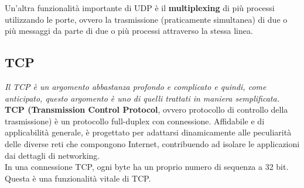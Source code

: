         Un’altra funzionalità importante di UDP è il \textbf{multiplexing} di più processi utilizzando le porte,
        ovvero la trasmissione (praticamente simultanea) di due o più messaggi da parte di due o più
        processi attraverso la stessa linea.
        
        \subsection{TCP}
        \textit{Il TCP è un argomento abbastanza profondo e complicato e quindi, come anticipato, questo
        argomento è uno di quelli trattati in maniera semplificata.}\\

        \textbf{TCP (Transmission Control Protocol}, ovvero protocollo di controllo della trasmissione) è un
        protocollo full-duplex con connessione. Affidabile e di applicabilità generale, è progettato per
        adattarsi dinamicamente alle peculiarità delle diverse reti che compongono Internet,
        contribuendo ad isolare le applicazioni dai dettagli di networking.\\
        
        In una connessione TCP, ogni byte ha un proprio numero di sequenza a 32 bit. Questa è una
        funzionalità vitale di TCP.\\
        
